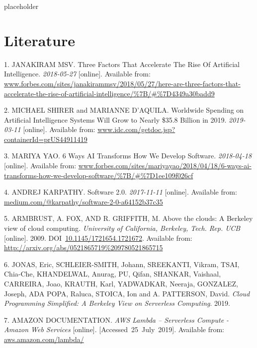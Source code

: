 \documentclass[12pt,english,a4paper,oneside,,tablecaptionabove]{scrbook}
\begin{document}
placeholder

\hypertarget{bibliography}{%
\chapter*{Literature}\label{bibliography}}

\hypertarget{refs}{}
\leavevmode\hypertarget{ref-JanakiramMSV}{}%
1. JANAKIRAM MSV. Three Factors That Accelerate The Rise Of Artificial
Intelligence. \emph{2018-05-27} {[}online{]}. Available from:
\url{www.forbes.com/sites/janakirammsv/2018/05/27/here-are-three-factors-that-accelerate-the-rise-of-artificial-intelligence/\%7B/\#\%7D4349a30badd9}

\leavevmode\hypertarget{ref-MichaelShirer}{}%
2. MICHAEL SHIRER and MARIANNE D'AQUILA. Worldwide Spending on
Artificial Intelligence Systems Will Grow to Nearly \$35.8 Billion in
2019. \emph{2019-03-11} {[}online{]}. Available from:
\url{www.idc.com/getdoc.jsp?containerId=prUS44911419}

\leavevmode\hypertarget{ref-MariyaYao}{}%
3. MARIYA YAO. 6 Ways AI Transforms How We Develop Software.
\emph{2018-04-18} {[}online{]}. Available from:
\url{www.forbes.com/sites/mariyayao/2018/04/18/6-ways-ai-transforms-how-we-develop-software/\%7B/\#\%7D1ee109f026cf}

\leavevmode\hypertarget{ref-AndrejKarpathy}{}%
4. ANDREJ KARPATHY. Software 2.0. \emph{2017-11-11} {[}online{]}.
Available from: \url{medium.com/@karpathy/software-2-0-a64152b37c35}

\leavevmode\hypertarget{ref-ArmbrustA.FoxandR.Griffith2009}{}%
5. ARMBRUST, A. FOX, AND R. GRIFFITH, M. Above the clouds: A Berkeley
view of cloud computing. \emph{University of California, Berkeley, Tech.
Rep. UCB} {[}online{]}. 2009.
DOI~\href{https://doi.org/10.1145/1721654.1721672}{10.1145/1721654.1721672}.
Available from: \url{http://arxiv.org/abs/0521865719\%209780521865715}

\leavevmode\hypertarget{ref-Jonas2019}{}%
6. JONAS, Eric, SCHLEIER-SMITH, Johann, SREEKANTI, Vikram, TSAI,
Chia-Che, KHANDELWAL, Anurag, PU, Qifan, SHANKAR, Vaishaal, CARREIRA,
Joao, KRAUTH, Karl, YADWADKAR, Neeraja, GONZALEZ, Joseph, ADA POPA,
Raluca, STOICA, Ion and A. PATTERSON, David. \emph{Cloud Programming
Simplified: A Berkeley View on Serverless Computing}. 2019.

\leavevmode\hypertarget{ref-Amazon}{}%
7. AMAZON DOCUMENTATION. \emph{AWS Lambda -- Serverless Compute - Amazon
Web Services} {[}online{]}. {[}Accessed~25~July~2019{]}. Available from:
\url{aws.amazon.com/lambda/}
\end{document}

